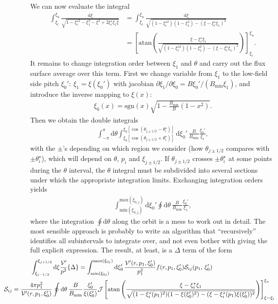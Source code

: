 \documentclass[11pt,a4paper]{article}
\newcommand{\rd}{\ensuremath{\mathrm{d}}}
\newcommand{\sub}[1]{\ensuremath{_{\text{#1}}}}
\newcommand{\Vp}{\ensuremath{\mathcal{V}'} }
\begin{document}
We can now evaluate the integral
\begin{align}
\int_{\xi_l}^{\xi_u} \frac{\rd \xi}{ \sqrt{1-\xi_i^{\star 2} - \xi_1^2 - \xi^2 + 2\xi_i^\star \xi_1 \xi} } &= \int_{\xi_l}^{\xi_u} \frac{\rd \xi}{ \sqrt{ (1-\xi_i^{\star 2})(1-\xi_1^2) - (\xi - \xi_i^\star \xi_1)^2 } } \nonumber \\
&= \left[ \mathrm{atan}\left(\frac{ \xi - \xi_i^\star \xi_1 }{ \sqrt{(1-\xi_i^{\star 2})(1-\xi_1^2) - (\xi - \xi_i^\star\xi_1)^2} }\right) \right]_{\xi_l}^{\xi_u}.
\end{align}
It remains to change integration order between $\xi_1$ and $\theta$ and carry out the flux surface average over this term. First we change variable from $\xi_1$ to the low-field side pitch $\xi_0': ~\xi_1 = \xi(\xi_0')$ with jacobian $\partial \xi_1/\partial \xi_0 = B\xi_0'/(B\sub{min}\xi_1)$, and introduce the inverse mapping to $\xi(x)$: 
\begin{align}
\xi_0(x) = \text{sgn}(x)\sqrt{1-\frac{B\sub{min}}{B}(1-x^2)}.
\end{align}
Then we obtain the double integrals
\begin{align}
\int_{-\pi}^\pi \rd\theta \int_{\xi_0[\cos(\theta_{j\pm1/2}+\theta_i^\star)]}^{\xi_0[\cos(\theta_{j\pm1/2}-\theta_i^\star)]}  \rd\xi_0' \, \frac{B}{B\sub{min}}\frac{\xi_0'}{\xi_1},
\end{align}
with the $\pm$'s depending on which region we consider (how $\theta_{j\pm1/2}$ compares with $\pm\theta_i^\star$), which will depend on $\theta$, $p_i$ and $\xi_{j\pm1/2}$. If $\theta_{j\pm 1/2}$ crosses $\pm\theta_i^\star$ at some points during the $\theta$ interval, the $\theta$ integral must be subdivided into several sections under which the appropriate integration limits. Exchanging integration orders yields
\begin{align}
\int_{\mathrm{min}(\xi_{0,j})}^{\mathrm{max}(\xi_{0,j})}\rd \xi_0' \oint \rd\theta \,\frac{B}{B\sub{min}}\frac{\xi_0'}{\xi_1},
\end{align}
where the integration $\oint \rd\theta$ along the orbit is a mess to work out in detail. The most sensible approach is probably to write an algorithm that ``recursively'' identifies all subintervals to integrate over, and not even bother with giving the full explicit expression. The result, at least, is a $\Delta$ term of the form
\begin{align}
&\int_{\xi_{j-1/2}}^{\xi_{j+1/2}}\rd\xi \frac{\Vp}{p^2}\{\Delta\} =\int_{\mathrm{min}(\xi_{0j})}^{\mathrm{max}(\xi_{0j})} \rd \xi_0' \, \frac{\Vp(r,p_1,\xi_0')}{p_1^2} f(r,p_1,\xi_0') \mathcal{S}_{ij}(p_1,\,\xi_0') \\
& \hspace{-15mm} \mathcal{S}_{ij} =  \frac{4\pi p_1^2}{\Vp(r,p_1,\xi_0')} \oint\rd\theta \,\frac{B}{B\sub{min}}\frac{\xi_0'}{\xi(\xi_0')}\mathcal{J}\left[ \mathrm{atan}\left(\frac{ \xi - \xi_i^\star \xi_1 }{ \sqrt{ (1 - \xi_i^\star(p_1)^2)(1-\xi(\xi_0')^2) - (\xi - \xi_i^\star(p_1)\xi(\xi_0'))^2} }\right) \right]_{\xi=\xi_l}^{\xi_u}
\end{align}
\end{document}

